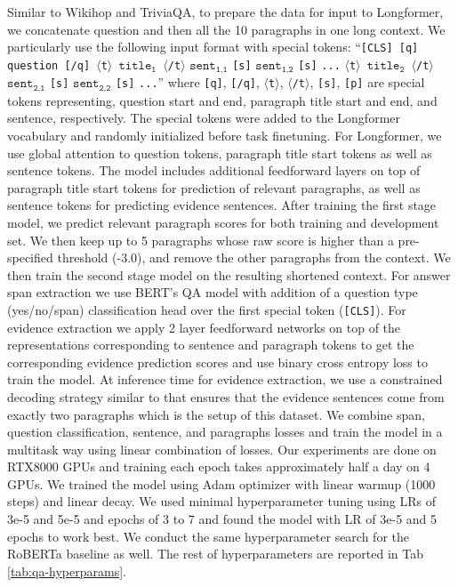 \documentclass[11pt,a4paper]{article}
\newcommand{\model}{Longformer\xspace}
\begin{document}
Similar to Wikihop and TriviaQA, to prepare the data for input to \model, we concatenate question and then all the 10 paragraphs in one long context. We particularly use the following input format with special tokens: ``\texttt{[CLS] [q] question [/q] $\langle$t$\rangle$ $\texttt{title}_{\texttt{1}}$ $\langle$/t$\rangle$} $\texttt{sent}_{\texttt{1,1}}$ \texttt{[s]} $\texttt{sent}_{\texttt{1,2}}$ \texttt{[s]} \texttt{...} \texttt{$\langle$t$\rangle$ $\texttt{title}_{\texttt{2}}$ $\langle$/t$\rangle$ }  $\texttt{sent}_{\texttt{2,1}}$ \texttt{[s]} $\texttt{sent}_{\texttt{2,2}}$ \texttt{[s]} \texttt{...}'' where \texttt{[q]}, \texttt{[/q]}, $\langle$\texttt{t}$\rangle$, $\langle$\texttt{/t}$\rangle$, \texttt{[s]}, \texttt{[p]} are special tokens representing, question start and end, paragraph title start and end, and sentence, respectively. The special tokens were added to the \model vocabulary and randomly initialized before task finetuning. For \model, we use global attention to question tokens, paragraph title start tokens as well as sentence tokens. The model includes additional feedforward layers on top of paragraph title start tokens for prediction of relevant paragraphs, as well as sentence tokens for predicting evidence sentences. After training the first stage model, we predict relevant paragraph scores for both training and development set. We then keep up to 5 paragraphs whose raw score is higher than a pre-specified threshold (-3.0), and remove the other paragraphs from the context. We then train the second stage model on the resulting shortened context. For answer span extraction we use BERT's QA model \cite{bert} with addition of a question type (yes/no/span) classification head over the first special token (\texttt{[CLS]}). For evidence extraction we apply 2 layer feedforward networks on top of the representations corresponding to sentence and paragraph tokens to get the corresponding evidence prediction scores and use binary cross entropy loss to train the model. At inference time for evidence extraction, we use a constrained decoding strategy similar to \citet{quark2020} that ensures that the evidence sentences come from exactly two paragraphs which is the setup of this dataset. We combine span, question classification, sentence, and paragraphs losses and train the model in a multitask way using linear combination of losses. Our experiments are done on RTX8000 GPUs and training each epoch takes approximately half a day on 4 GPUs.
We trained the model using Adam optimizer with linear warmup (1000 steps) and linear decay. We used minimal hyperparameter tuning using LRs of 3e-5 and 5e-5 and epochs of 3 to 7 and found the model with LR of 3e-5 and 5 epochs to work best. We conduct the same hyperparameter search for the RoBERTa baseline as well. The rest of hyperparameters are reported in Tab \ref{tab:qa-hyperparams}. 
\end{document}
